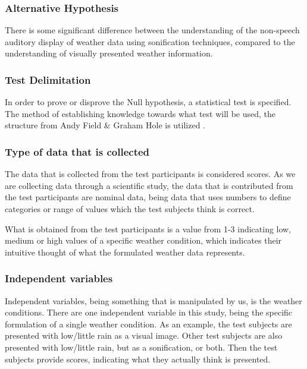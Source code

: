 

\subsubsection{Alternative Hypothesis} %
\label{ssub:alternative_hypothesis}

There is some significant difference between the understanding of the non-speech auditory display of weather data using sonification techniques, compared to the understanding of visually presented weather information.


\subsubsection{Test Delimitation} %
\label{ssub:test_delimitation}

In order to prove or disprove the Null hypothesis, a statistical test is specified.
The method of establishing knowledge towards what test will be used, the structure from Andy Field \& Graham Hole is utilized \cite[c.8][]{Field2003}.

\subsubsection{Type of data that is collected} %
\label{ssub:type_of_data_that_is_collected}

The data that is collected from the test participants is considered scores. 
As we are collecting data through a scientific study, the data that is contributed from the test participants are nominal data, being data that uses numbers to define categories or range of values which the test subjects think is correct.


What is obtained from the test participants is a value from 1-3 indicating low, medium or high values of a specific weather condition, which indicates their intuitive thought of what the formulated weather data represents.


\subsubsection{Independent variables} %
\label{ssub:independent_variables}

Independent variables, being something that is manipulated by us, is the weather conditions. 
There are one independent variable in this study, being the specific formulation of a single weather condition. 
As an example, the test subjects are presented with low/little rain as a visual image. 
Other test subjects are also presented with low/little rain, but as a sonification, or both. 
Then the test subjects provide scores, indicating what they actually think is presented.


